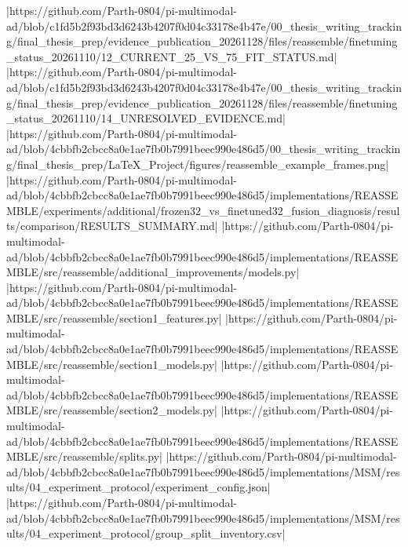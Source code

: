 |https://github.com/Parth-0804/pi-multimodal-ad/blob/c1fd5b2f93bd3d6243b4207f0d04c33178e4b47e/00_thesis_writing_tracking/final_thesis_prep/evidence_publication_20261128/files/reassemble/finetuning_status_20261110/12_CURRENT_25_VS_75_FIT_STATUS.md|
|https://github.com/Parth-0804/pi-multimodal-ad/blob/c1fd5b2f93bd3d6243b4207f0d04c33178e4b47e/00_thesis_writing_tracking/final_thesis_prep/evidence_publication_20261128/files/reassemble/finetuning_status_20261110/14_UNRESOLVED_EVIDENCE.md|
|https://github.com/Parth-0804/pi-multimodal-ad/blob/4cbbfb2cbcc8a0e1ae7fb0b7991beec990e486d5/00_thesis_writing_tracking/final_thesis_prep/LaTeX_Project/figures/reassemble_example_frames.png|
|https://github.com/Parth-0804/pi-multimodal-ad/blob/4cbbfb2cbcc8a0e1ae7fb0b7991beec990e486d5/implementations/REASSEMBLE/experiments/additional/frozen32_vs_finetuned32_fusion_diagnosis/results/comparison/RESULTS_SUMMARY.md|
|https://github.com/Parth-0804/pi-multimodal-ad/blob/4cbbfb2cbcc8a0e1ae7fb0b7991beec990e486d5/implementations/REASSEMBLE/src/reassemble/additional_improvements/models.py|
|https://github.com/Parth-0804/pi-multimodal-ad/blob/4cbbfb2cbcc8a0e1ae7fb0b7991beec990e486d5/implementations/REASSEMBLE/src/reassemble/section1_features.py|
|https://github.com/Parth-0804/pi-multimodal-ad/blob/4cbbfb2cbcc8a0e1ae7fb0b7991beec990e486d5/implementations/REASSEMBLE/src/reassemble/section1_models.py|
|https://github.com/Parth-0804/pi-multimodal-ad/blob/4cbbfb2cbcc8a0e1ae7fb0b7991beec990e486d5/implementations/REASSEMBLE/src/reassemble/section2_models.py|
|https://github.com/Parth-0804/pi-multimodal-ad/blob/4cbbfb2cbcc8a0e1ae7fb0b7991beec990e486d5/implementations/REASSEMBLE/src/reassemble/splits.py|
|https://github.com/Parth-0804/pi-multimodal-ad/blob/4cbbfb2cbcc8a0e1ae7fb0b7991beec990e486d5/implementations/MSM/results/04_experiment_protocol/experiment_config.json|
|https://github.com/Parth-0804/pi-multimodal-ad/blob/4cbbfb2cbcc8a0e1ae7fb0b7991beec990e486d5/implementations/MSM/results/04_experiment_protocol/group_split_inventory.csv|
